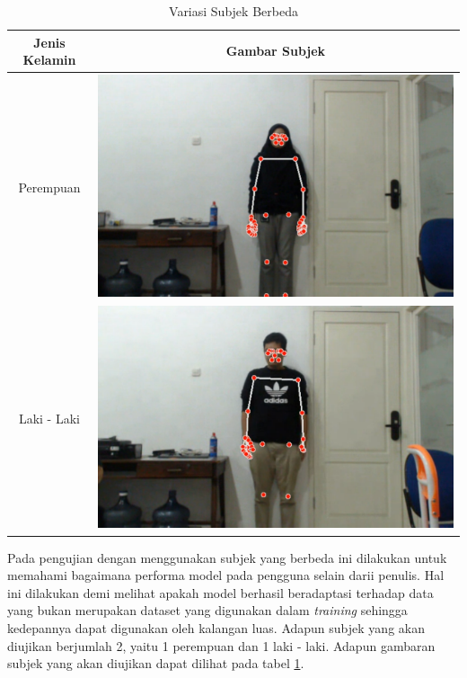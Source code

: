\begin{longtable}{|c|c|}
  \caption{Variasi Subjek Berbeda}
  \label{tb:kondisisubjek}                                   \\
  \hline
  \rowcolor[HTML]{C0C0C0}
  \textbf{Jenis Kelamin} & \textbf{Gambar Subjek}  \\
  \hline
  Perempuan              &  \includegraphics[scale=0.3]{gambar/bab4-rani.png}                \\
  \hline
  Laki - Laki            & \includegraphics[scale=0.3]{gambar/bab4-evan.png}                 \\
  \hline
\end{longtable}

Pada pengujian dengan menggunakan subjek yang berbeda ini dilakukan untuk memahami bagaimana performa model pada pengguna selain darii penulis. Hal ini dilakukan demi melihat apakah model berhasil beradaptasi terhadap data yang bukan merupakan dataset yang digunakan dalam \emph{training} sehingga kedepannya dapat digunakan oleh kalangan luas. Adapun subjek yang akan diujikan berjumlah 2, yaitu 1 perempuan dan 1 laki - laki. Adapun gambaran subjek yang akan diujikan dapat dilihat pada tabel \ref{tb:kondisisubjek}. 

